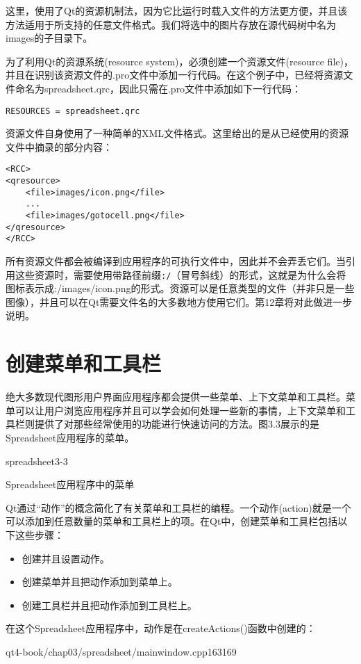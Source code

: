 \documentclass[11pt,oneside]{book}
\begin{document}
\begin{common-format}
这里，使用了Qt的资源机制法，因为它比运行时载入文件的方法更方便，并且该方法适用于所支持的任意文件格式。我们将选中的图片存放在源代码树中名为images的子目录下。

为了利用Qt的资源系统(resource system)，必须创建一个资源文件(resource file)，并且在识别该资源文件的.pro文件中添加一行代码。在这个例子中，已经将资源文件命名为spreadsheet.qrc，因此只需在.pro文件中添加如下一行代码：
\begin{Verbatim}
RESOURCES = spreadsheet.qrc
\end{Verbatim}

资源文件自身使用了一种简单的XML文件格式。这里给出的是从已经使用的资源文件中摘录的部分内容：
\begin{Verbatim}
<RCC>
<qresource>
    <file>images/icon.png</file>
    ...
    <file>images/gotocell.png</file>
</qresource>
</RCC>
\end{Verbatim}

所有资源文件都会被编译到应用程序的可执行文件中，因此并不会弄丢它们。当引用这些资源时，需要使用带路径前缀\verb+:/+（冒号斜线）的形式，这就是为什么会将图标表示成:/images/icon.png的形式。资源可以是任意类型的文件（并非只是一些图像），并且可以在Qt需要文件名的大多数地方使用它们。第12章将对此做进一步说明。  

\section{创建菜单和工具栏}
绝大多数现代图形用户界面应用程序都会提供一些菜单、上下文菜单和工具栏。菜单可以让用户浏览应用程序并且可以学会如何处理一些新的事情，上下文菜单和工具栏则提供了对那些经常使用的功能进行快速访问的方法。图3.3展示的是Spreadsheet应用程序的菜单。
\begin{linefig}[0.9]{spreadsheet3-3}
\caption{Spreadsheet应用程序中的菜单}
\label{fig:spreadsheet3-3}
\end{linefig}

Qt通过“动作”的概念简化了有关菜单和工具栏的编程。一个动作(action)就是一个可以添加到任意数量的菜单和工具栏上的项。在Qt中，创建菜单和工具栏包括以下这些步骤：
\begin{itemize}
\item 创建并且设置动作。
\item 创建菜单并且把动作添加到菜单上。
\item 创建工具栏并且把动作添加到工具栏上。
\end{itemize}

在这个Spreadsheet应用程序中，动作是在createActions()函数中创建的：
\begin{cppline}{qt4-book/chap03/spreadsheet/mainwindow.cpp}{163}{169}
\end{cppline}


\end{common-format}
\end{document}
